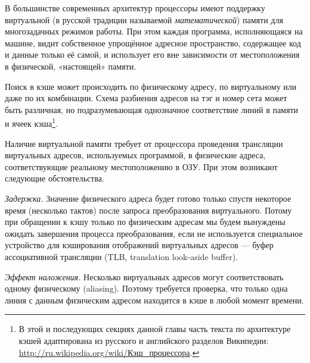 В большинстве современных архитектур процессоры имеют поддержку виртуальной (в русской традиции называемой \textit{математической}) памяти для многозадачных режимов работы. При этом каждая программа, исполняющаяся на машине, видит собственное упрощённое адресное пространство, содержащее код и данные только её самой, и использует его вне зависимости от местоположения в физической, «настоящей» памяти. 

Поиск в кэше может происходить по физическому адресу, по виртуальному или даже по их комбинации. Схема разбиения адресов на тэг и номер сета может быть различная, но подразумевающая однозначное соответствие линий в памяти и ячеек кэша\footnote{В этой и последующих секциях данной главы часть текста по архитектуре кэшей адаптирована из русского и английского разделов Википедии: \url{http://ru.wikipedia.org/wiki/Кэш_процессора}.}.

Наличие виртуальной памяти требует от процессора проведения трансляции виртуальных  адресов, используемых программой, в физические адреса, соответствующие реальному местоположению в ОЗУ. При этом возникают следующие обстоятельства.

\begin{itemize*}
\item    \textit{Задержка.} Значение физического адреса будет готово только спустя некоторое время (несколько тактов) после запроса преобразования виртуального. Потому при обращении к кэшу только по физическим адресам мы будем вынуждены ожидать завершения процесса преобразования, если не используется специальное устройство для кэширования отображений виртуальных адресов --- буфер ассоциативной трансляции (\abbr TLB, translation look-aside buffer).

\item    \textit{Эффект наложения.} Несколько виртуальных адресов могут соответствовать одному физическому (\abbr aliasing). Поэтому требуется проверка, что только одна линия с данным физическим адресом находится в кэше в любой момент времени.
\end{itemize*}

